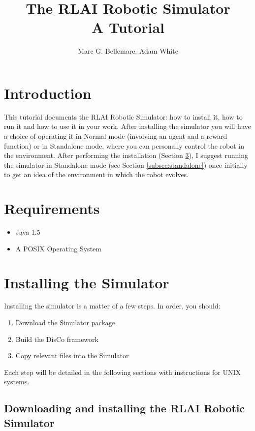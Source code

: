 \documentclass[12pt]{article}
\author{Marc G. Bellemare, Adam White}
\title{The RLAI Robotic Simulator\\ A Tutorial}
\begin{document}
\maketitle

\section{Introduction}

This tutorial documents the RLAI Robotic Simulator: how to install it, how
to run it and how to use it in your work. After installing the simulator
you will have a choice of operating it in Normal mode (involving an agent
and a reward function) or in Standalone mode, where you can personally 
control the robot in the environment. After performing the installation
(Section \ref{sec:installation}),  I suggest running the simulator in 
Standalone mode (see Section \ref{subsec:standalone}) once initially to get
an idea of the environment in which the robot evolves. 

\section{Requirements}

\begin{itemize}
\item{Java 1.5}
\item{A POSIX Operating System}
\end{itemize}

\section{Installing the Simulator}\label{sec:installation}

Installing the simulator is a matter of a few steps. In order, you should:

\begin{enumerate}
\item{Download the Simulator package}
\item{Build the DisCo framework}
\item{Copy relevant files into the Simulator}
\end{enumerate}

Each step will be detailed in the following sections with instructions for
UNIX systems.

\subsection{Downloading and installing the RLAI Robotic Simulator}
\end{document}
